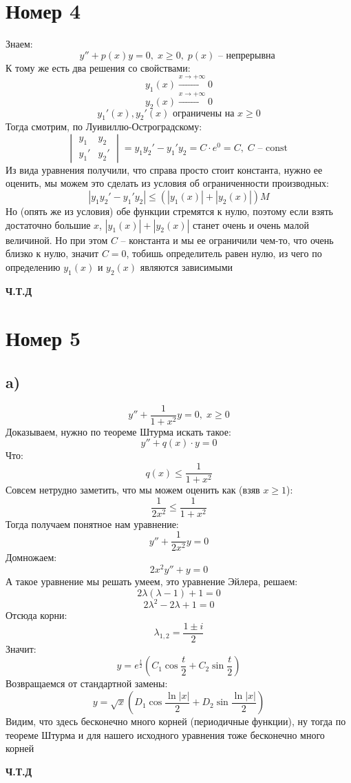 \documentclass[a4paper,12pt]{article}
\begin{document}
\section*{Номер 4}
Знаем:
\[
y'' + p(x) y = 0, \; x \geq 0, \; p(x) \text{ -- непрерывна }
\]
К тому же есть два решения со свойствами:
\[
y_1(x) \overset{x \rightarrow + \infty }{\longrightarrow} 0 
\]
\[
y_2(x) \overset{x \rightarrow + \infty }{\longrightarrow} 0 
\]
\[
y_1'(x), y_2'(x) \text{  ограничены на } x \geq 0 
\]
Тогда смотрим, по Луивиллю-Остроградскому:
\[
\begin{vmatrix}
y_1 & y_2 \\
y_1' & y_2'
\end{vmatrix} = y_1 y_2' - y_1' y_2 = C \cdot e^{0} = C, \; C \text{ -- const }
\]
Из вида уравнения получили, что справа просто стоит константа, нужно ее оценить, мы можем это сделать из условия об ограниченности производных:
\[
|y_1 y_2' - y_1' y_2| \leq \left(
|y_1(x)| + |y_2(x)| 
\right) M 
\]
Но (опять же из условия) обе функции стремятся к нулю, поэтому если взять достаточно большие $x$, $|y_1(x)| + |y_2(x)|$ станет очень и очень малой величиной. Но при этом $C$ -- константа и мы ее ограничили чем-то, что очень близко к нулю, значит $C = 0$, тобишь определитель равен нулю, из чего по определению $y_1(x)$ и $y_2(x)$ являются зависимыми
\begin{center}
\textbf{Ч.Т.Д} 
\end{center}
\clearpage
\section*{Номер 5}
\subsection*{a)}
\[
y'' + \frac{1}{1 + x^2} y = 0, \; x \geq 0 
\]
Доказываем, нужно по теореме Штурма искать такое:
\[
y'' + q(x) \cdot  y = 0
\]
Что:
\[
q(x) \leq \frac{1}{1 + x^2}
\] 
Совсем нетрудно заметить, что мы можем оценить как (взяв $x \geq 1$):
\[
\frac{1}{2x^2} \leq \frac{1}{1 + x^2}
\]
Тогда получаем понятное нам уравнение:
\[
y'' + \frac{1}{2x^2} y = 0
\]
Домножаем:
\[
2x^2y'' + y = 0
\]
А такое уравнение мы решать умеем, это уравнение Эйлера, решаем:
\[
2 \lambda ( \lambda -  1) + 1 = 0 
\]
\[
2\lambda^2 - 2 \lambda + 1  = 0
\]
Отсюда корни:
\[
\lambda_{1, 2} = \frac{1 \pm i }{2 }
\]
Значит:
\[
y = e^{\frac{t}{2}} \left(
C_1 \cos \frac{t}{2} + C_2 \sin \frac{t}{2}
\right)
\]
Возвращаемся от стандартной замены:
\[
y = \sqrt{x} \left(
D_1 \cos \frac{\ln |x| }{2} + D_2 \sin \frac{\ln |x| }{2}
\right)
\]
Видим, что здесь бесконечно много корней (периодичные функции), ну тогда по теореме Штурма и для нашего исходного уравнения тоже бесконечно много корней
\begin{center}
\textbf{Ч.Т.Д} 
\end{center}
\clearpage
\end{document}
